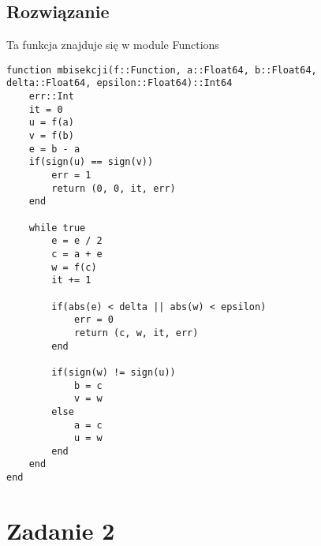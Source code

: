 \documentclass{article}
\begin{document}
\subsection{Rozwiązanie}
Ta funkcja znajduje się w module Functions
\begin{verbatim}
function mbisekcji(f::Function, a::Float64, b::Float64, delta::Float64, epsilon::Float64)::Int64
    err::Int
    it = 0
    u = f(a)
    v = f(b)
    e = b - a
    if(sign(u) == sign(v)) 
        err = 1
        return (0, 0, it, err)
    end

    while true
        e = e / 2
        c = a + e
        w = f(c)
        it += 1

        if(abs(e) < delta || abs(w) < epsilon)
            err = 0
            return (c, w, it, err)
        end

        if(sign(w) != sign(u))
            b = c
            v = w
        else 
            a = c
            u = w
        end
    end
end
\end{verbatim}
\section{Zadanie 2}
\end{document}
